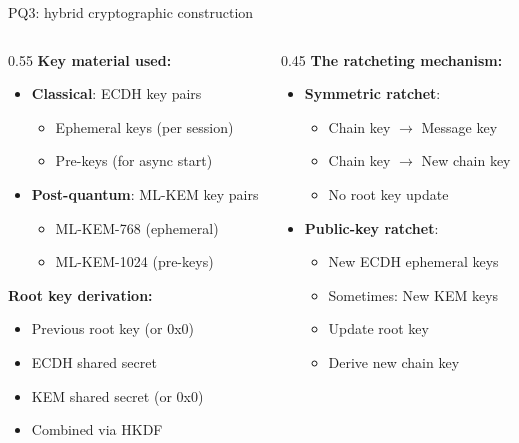 \ifdefined\PRESENTATION\else\PassOptionsToClass{handout}{beamer}\fi\documentclass[aspectratio=169, lualatex]{beamer}
\begin{document}
\begin{frame}{PQ3: hybrid cryptographic construction}
	\begin{columns}[c]
		\begin{column}{0.55\textwidth}
			\textbf{Key material used:}
			\begin{itemize}
				\item \textbf{Classical}: ECDH key pairs
				      \begin{itemize}
					      \item Ephemeral keys (per session)
					      \item Pre-keys (for async start)
				      \end{itemize}
				\item \textbf{Post-quantum}: ML-KEM key pairs
				      \begin{itemize}
					      \item ML-KEM-768 (ephemeral)
					      \item ML-KEM-1024 (pre-keys)
				      \end{itemize}
			\end{itemize}

			\textbf{Root key derivation:}
			\begin{itemize}
				\item Previous root key (or 0x0)
				\item ECDH shared secret
				\item KEM shared secret (or 0x0)
				\item Combined via HKDF
			\end{itemize}
		\end{column}
		\begin{column}{0.45\textwidth}
			\textbf{The ratcheting mechanism:}
			\begin{itemize}
				\item \textbf{Symmetric ratchet}:
				      \begin{itemize}
					      \item Chain key $\rightarrow$ Message key
					      \item Chain key $\rightarrow$ New chain key
					      \item No root key update
				      \end{itemize}
				\item \textbf{Public-key ratchet}:
				      \begin{itemize}
					      \item New ECDH ephemeral keys
					      \item Sometimes: New KEM keys
					      \item Update root key
					      \item Derive new chain key
				      \end{itemize}
			\end{itemize}


\end{column}
\end{columns}
\end{frame}
\end{document}
